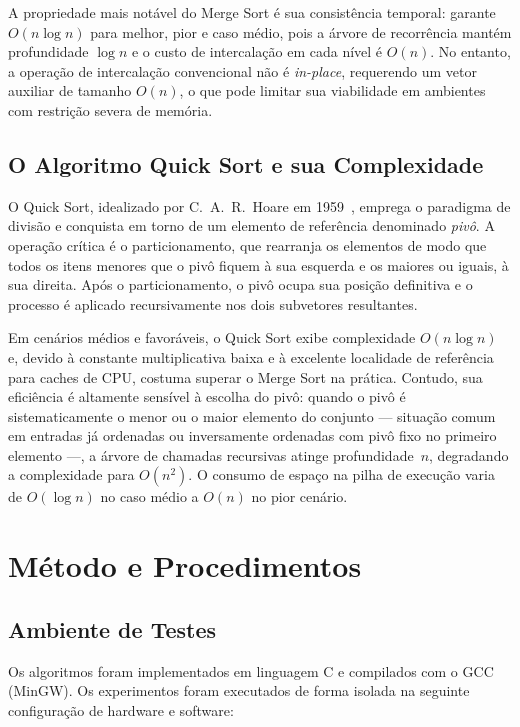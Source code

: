 \documentclass[12pt]{article}
\begin{document}
A propriedade mais notável do Merge Sort é sua consistência temporal: garante
$O(n \log n)$ para melhor, pior e caso médio, pois a árvore de recorrência
mantém profundidade $\log n$ e o custo de intercalação em cada nível é $O(n)$.
No entanto, a operação de intercalação convencional não é \textit{in-place},
requerendo um vetor auxiliar de tamanho $O(n)$, o que pode limitar sua
viabilidade em ambientes com restrição severa de memória.

\subsection{O Algoritmo Quick Sort e sua Complexidade}

O Quick Sort, idealizado por C.~A.~R.~Hoare em 1959~\cite{knuth}, emprega o
paradigma de divisão e conquista em torno de um elemento de referência
denominado \textit{pivô}. A operação crítica é o particionamento, que
rearranja os elementos de modo que todos os itens menores que o pivô fiquem à
sua esquerda e os maiores ou iguais, à sua direita. Após o particionamento, o
pivô ocupa sua posição definitiva e o processo é aplicado recursivamente nos
dois subvetores resultantes.

Em cenários médios e favoráveis, o Quick Sort exibe complexidade $O(n \log n)$
e, devido à constante multiplicativa baixa e à excelente localidade de
referência para caches de CPU, costuma superar o Merge Sort na prática.
Contudo, sua eficiência é altamente sensível à escolha do pivô: quando o
pivô é sistematicamente o menor ou o maior elemento do conjunto — situação
comum em entradas já ordenadas ou inversamente ordenadas com pivô fixo no
primeiro elemento —, a árvore de chamadas recursivas atinge profundidade~$n$,
degradando a complexidade para $O(n^2)$. O consumo de espaço na pilha de
execução varia de $O(\log n)$ no caso médio a $O(n)$ no pior cenário.

\section{Método e Procedimentos}

\subsection{Ambiente de Testes}

Os algoritmos foram implementados em linguagem C e compilados com o GCC
(MinGW). Os experimentos foram executados de forma isolada na seguinte
configuração de hardware e software:
\end{document}
